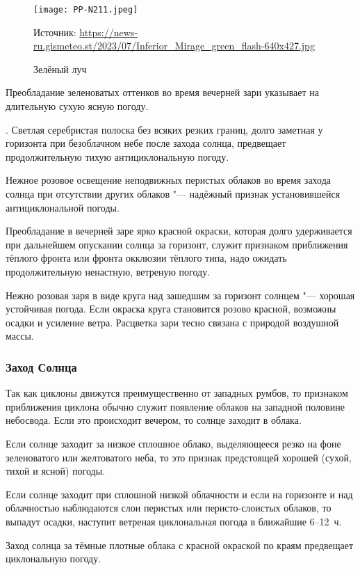 \begin{figure}[htb]
  \centering{}
  \texttt{[image: PP-N211.jpeg]}
  \caption{Зелёный луч}
  \label{fig:pp-n211}
  \scriptsize
  \centering{}Источник: \url{https://news-ru.gismeteo.st/2023/07/Inferior_Mirage_green_flash-640x427.jpg}
\end{figure}

 Преобладание зеленоватых оттенков во время вечерней зари
указывает на длительную сухую ясную погоду.

. Светлая серебристая полоска без всяких резких границ, долго
заметная у горизонта при безоблачном небе после захода солнца,
предвещает продолжительную тихую антициклональную погоду.

 Нежное розовое освещение неподвижных перистых облаков во время
захода солнца при отсутствии других облаков "--- надёжный признак
установившейся антициклональной погоды.

 Преобладание в вечерней заре ярко красной окраски, которая
долго удерживается при дальнейшем опускании солнца за горизонт, служит
признаком приближения тёплого фронта или фронта окклюзии тёплого типа,
надо ожидать продолжительную ненастную, ветреную погоду.

 Нежно розовая заря в виде круга над зашедшим за горизонт солнцем
"--- хорошая устойчивая погода. Если окраска круга становится розово
красной, возможны осадки и усиление ветра. Расцветка зари тесно
связана с природой воздушной массы.

\subsubsection{Заход Солнца}

Так как циклоны движутся преимущественно от западных румбов, то
признаком приближения циклона обычно служит появление облаков на
западной половине небосвода. Если это происходит вечером, то солнце
заходит в облака.

 Если солнце заходит за низкое сплошное облако, выделяющееся
резко на фоне зеленоватого или желтоватого неба, то это признак
предстоящей хорошей (сухой, тихой и ясной) погоды.

 Если солнце заходит при сплошной низкой облачности и если на
горизонте и над облачностью наблюдаются слои перистых или
перисто-слоистых облаков, то выпадут осадки, наступит ветреная
циклональная погода в ближайшие 6--12~ч.

 Заход солнца за тёмные плотные облака с красной окраской по
краям предвещает циклональную погоду.

